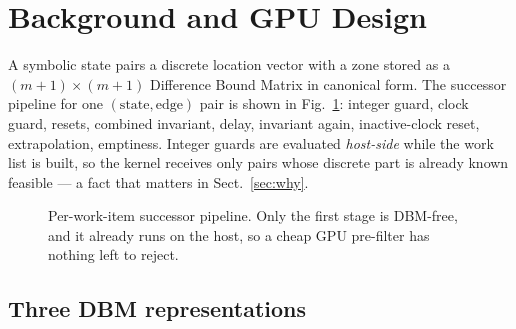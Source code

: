 \section{Background and GPU Design}
\label{sec:design}

A symbolic state pairs a discrete location vector with a zone stored as a
$(m{+}1)\times(m{+}1)$ Difference Bound Matrix in canonical form. The successor pipeline for
one $(\text{state},\text{edge})$ pair is shown in Fig.~\ref{fig:kernel}: integer guard, clock
guard, resets, combined invariant, delay, invariant again, inactive-clock reset,
extrapolation, emptiness. Integer guards are evaluated \emph{host-side} while the work list
is built, so the kernel receives only pairs whose discrete part is already known feasible ---
a fact that matters in Sect.~\ref{sec:why}.

\begin{figure}[t]
\centering
{}
\caption{Per-work-item successor pipeline. Only the first stage is DBM-free, and it already
runs on the host, so a cheap GPU pre-filter has nothing left to reject.}
\label{fig:kernel}
\end{figure}

\subsection{Three DBM representations}
\label{sec:reps}

